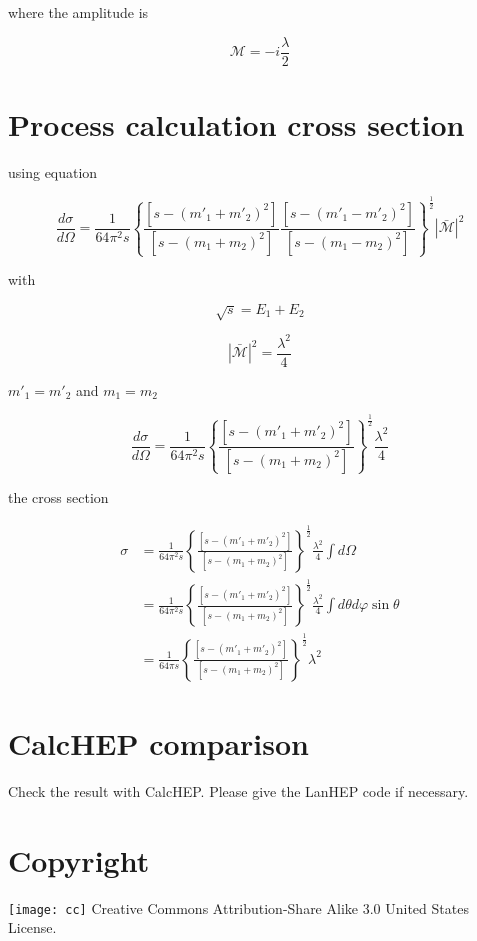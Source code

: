 where the amplitude is

\begin{equation}
\mathcal{M} = -i \frac{\lambda}{2}
\end{equation}

\section{Process calculation cross section}

using equation

\begin{equation}
\frac{d\sigma}{d\Omega} = \frac{1}{64 \pi^2 s} \left\{ \frac{ [s-(m'_1 +m'_2)^2]}{[s-(m_1 + m_2)^2]} \frac{[s-(m'_1 - m'_2)^2 ]}{[s-(m_1 -m_2)^2]} \right\}^{\frac{1}{2}} | \bar{\mathcal{M}} |^2  
\end{equation}

with

\begin{equation}
\sqrt{s} = E_1 + E_2
\end{equation}

\begin{equation}
|\bar{ \mathcal{M} } |^2 = \frac{\lambda^2}{4}
\end{equation}

$m'_1 =m'_2 $ and $m_1 =m_2$  

\begin{equation}
\frac{d\sigma}{d\Omega} = \frac{1}{64 \pi^2 s} \left\{ \frac{ [s-(m'_1 +m'_2)^2]}{[s-(m_1 + m_2)^2]} \right\}^{\frac{1}{2}}  \frac{\lambda^2}{4}  
\end{equation}

the cross section

\begin{equation}
\begin{split}
\sigma &= \frac{1}{64 \pi^2 s} \left\{ \frac{ [s-(m'_1 +m'_2)^2]}{[s-(m_1 + m_2)^2]} \right\}^{\frac{1}{2}}  \frac{\lambda^2}{4} \int{ d\Omega}\\
&= \frac{1}{64 \pi^2 s} \left\{ \frac{ [s-(m'_1 +m'_2)^2]}{[s-(m_1 + m_2)^2]} \right\}^{\frac{1}{2}}  \frac{\lambda^2}{4} \int{ d\theta d\varphi \sin{\theta}}\\
&= \frac{1}{64 \pi s} \left\{ \frac{ [s-(m'_1 +m'_2)^2]}{[s-(m_1 + m_2)^2]} \right\}^{\frac{1}{2}}  \lambda^2
\end{split}
\end{equation}


\section{CalcHEP comparison}
Check the result with CalcHEP. Please give the LanHEP code if necessary.

\section{Copyright}
\texttt{[image: cc]} Creative Commons Attribution-Share Alike 3.0 United States License.





